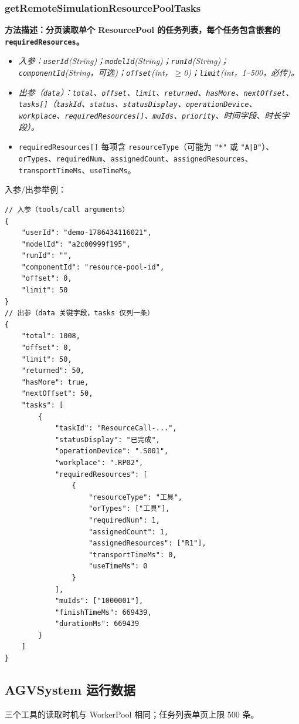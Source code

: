 \subsubsection{getRemoteSimulationResourcePoolTasks}
\bf{方法描述}：分页读取单个 ResourcePool 的任务列表，每个任务包含嵌套的 \texttt{requiredResources}。
\begin{itemize}
	\item \it{入参}：\texttt{userId}(String)；\texttt{modelId}(String)；\texttt{runId}(String)；\texttt{componentId}(String，可选)；\texttt{offset}(int，$\geq$0)；\texttt{limit}(int，1--500，必传)。
	\item \it{出参}（\texttt{data}）：\texttt{total}、\texttt{offset}、\texttt{limit}、\texttt{returned}、\texttt{hasMore}、\texttt{nextOffset}、\texttt{tasks[]}（\texttt{taskId}、\texttt{status}、\texttt{statusDisplay}、\texttt{operationDevice}、\texttt{workplace}、\texttt{requiredResources[]}、\texttt{muIds}、\texttt{priority}、时间字段、时长字段）。
	\item \texttt{requiredResources[]} 每项含 \texttt{resourceType}（可能为 \texttt{"*"} 或 \texttt{"A|B"}）、\texttt{orTypes}、\texttt{requiredNum}、\texttt{assignedCount}、\texttt{assignedResources}、\texttt{transportTimeMs}、\texttt{useTimeMs}。
\end{itemize}
入参/出参举例：
\begin{lstlisting}
// 入参（tools/call arguments）
{
    "userId": "demo-1786434116021",
    "modelId": "a2c00999f195",
    "runId": "",
    "componentId": "resource-pool-id",
    "offset": 0,
    "limit": 50
}
// 出参（data 关键字段，tasks 仅列一条）
{
    "total": 1008,
    "offset": 0,
    "limit": 50,
    "returned": 50,
    "hasMore": true,
    "nextOffset": 50,
    "tasks": [
        {
            "taskId": "ResourceCall-...",
            "statusDisplay": "已完成",
            "operationDevice": ".S001",
            "workplace": ".RP02",
            "requiredResources": [
                {
                    "resourceType": "工具",
                    "orTypes": ["工具"],
                    "requiredNum": 1,
                    "assignedCount": 1,
                    "assignedResources": ["R1"],
                    "transportTimeMs": 0,
                    "useTimeMs": 0
                }
            ],
            "muIds": ["1000001"],
            "finishTimeMs": 669439,
            "durationMs": 669439
        }
    ]
}
\end{lstlisting}\vspace{-30pt}

\subsection{AGVSystem 运行数据}
三个工具的读取时机与 WorkerPool 相同；任务列表单页上限 500 条。

